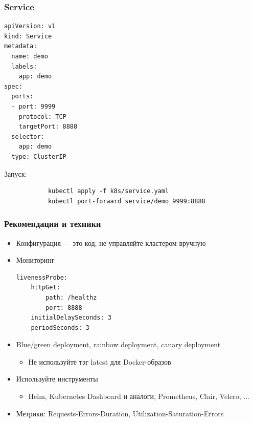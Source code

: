 \documentclass{../../slides-style}
\begin{document}
    \begin{frame}[fragile]
        \frametitle{Service}
        \begin{footnotesize}
            \begin{verbatim}
apiVersion: v1
kind: Service
metadata:
  name: demo
  labels:
    app: demo
spec:
  ports:
  - port: 9999
    protocol: TCP
    targetPort: 8888
  selector:
    app: demo
  type: ClusterIP
            \end{verbatim}
        \end{footnotesize}
        Запуск:
        \begin{verbatim}
            kubectl apply -f k8s/service.yaml
            kubectl port-forward service/demo 9999:8888
        \end{verbatim}
    \end{frame}

    \begin{frame}[fragile]
        \frametitle{Рекомендации и техники}
        \begin{itemize}
            \item Конфигурация --- это код, не управляйте кластером вручную
            \item Мониторинг
                \begin{scriptsize}
                    \begin{verbatim}
livenessProbe:
    httpGet:
        path: /healthz
        port: 8888
    initialDelaySeconds: 3
    periodSeconds: 3
                    \end{verbatim}
                \end{scriptsize}
            \item Blue/green deployment, rainbow deployment, canary deployment
            \begin{itemize}
                \item Не используйте тэг latest для Docker-образов
            \end{itemize}
            \item Используйте инструменты
            \begin{itemize}
                \item Helm, Kubernetes Dashboard и аналоги, Prometheus, Clair, Velero, ...
            \end{itemize}
            \item Метрики: Requests-Errors-Duration, Utilization-Saturation-Errors
        \end{itemize}
    \end{frame}
\end{document}
